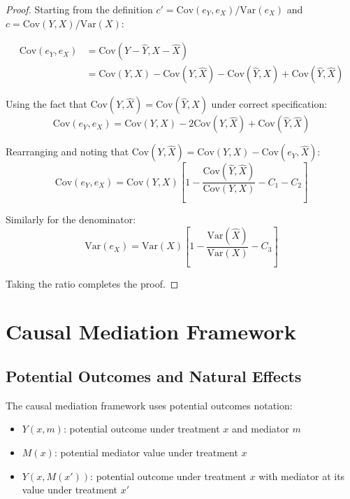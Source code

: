 \documentclass[11pt,a4paper]{article}
\newcommand{\Var}{\text{Var}}
\newcommand{\Cov}{\text{Cov}}
\begin{document}
\begin{proof}
Starting from the definition $c' = \Cov(e_Y, e_X) / \Var(e_X)$ and $c = \Cov(Y,X) / \Var(X)$:

\begin{align}
\Cov(e_Y, e_X) &= \Cov(Y - \hat{Y}, X - \hat{X}) \\
&= \Cov(Y,X) - \Cov(Y,\hat{X}) - \Cov(\hat{Y},X) + \Cov(\hat{Y},\hat{X})
\end{align}

Using the fact that $\Cov(Y,\hat{X}) = \Cov(\hat{Y},X)$ under correct specification:
\begin{equation}
\Cov(e_Y, e_X) = \Cov(Y,X) - 2\Cov(Y,\hat{X}) + \Cov(\hat{Y},\hat{X})
\end{equation}

Rearranging and noting that $\Cov(Y,\hat{X}) = \Cov(Y,X) - \Cov(e_Y,\hat{X})$:
\begin{equation}
\Cov(e_Y, e_X) = \Cov(Y,X)\left[1 - \frac{\Cov(\hat{Y},\hat{X})}{\Cov(Y,X)} - C_1 - C_2\right]
\end{equation}

Similarly for the denominator:
\begin{equation}
\Var(e_X) = \Var(X)\left[1 - \frac{\Var(\hat{X})}{\Var(X)} - C_3\right]
\end{equation}

Taking the ratio completes the proof.
\end{proof}

\section{Causal Mediation Framework}

\subsection{Potential Outcomes and Natural Effects}

The causal mediation framework \citep{pearl2001direct, imai2010general} uses potential outcomes notation:
\begin{itemize}
    \item $Y(x,m)$: potential outcome under treatment $x$ and mediator $m$
    \item $M(x)$: potential mediator value under treatment $x$
    \item $Y(x,M(x'))$: potential outcome under treatment $x$ with mediator at its value under treatment $x'$
\end{itemize}
\end{document}
